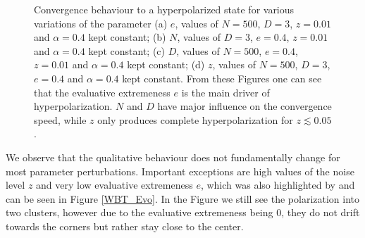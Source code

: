 \documentclass[11pt]{article}
\begin{document}
\begin{figure}[!h]
\begin{center}
\end{center}
\caption{Convergence behaviour to a hyperpolarized state for various variations of the parameter (a) $e$, values of $N=500$, $D=3$, $z=0.01$ and $\alpha=0.4$ kept constant; (b) $N$, values of $D=3$, $e=0.4$, $z=0.01$ and $\alpha=0.4$ kept constant; (c) $D$, values of $N=500$, $e=0.4$, $z=0.01$ and $\alpha=0.4$ kept constant; (d) $z$, values of $N=500$, $D=3$, $e=0.4$ and $\alpha=0.4$ kept constant. From these Figures one can see that the evaluative extremeness $e$ is the main driver of hyperpolarization. $N$ and $D$ have major influence on the convergence speed, while $z$ only produces complete hyperpolarization for $z \lesssim 0.05$.}
\label{ana_wbt}
\end{figure}

We observe that the qualitative behaviour does not fundamentally change for most parameter perturbations. Important exceptions are high values of the noise level $z$ and very low evaluative extremeness $e$, which was also highlighted by \citep{schweighofer2020} and can be seen in Figure \ref{WBT_Evo}. In the Figure we still see the polarization into two clusters, however due to the evaluative extremeness being 0, they do not drift towards the corners but rather stay close to the center.
\end{document}
